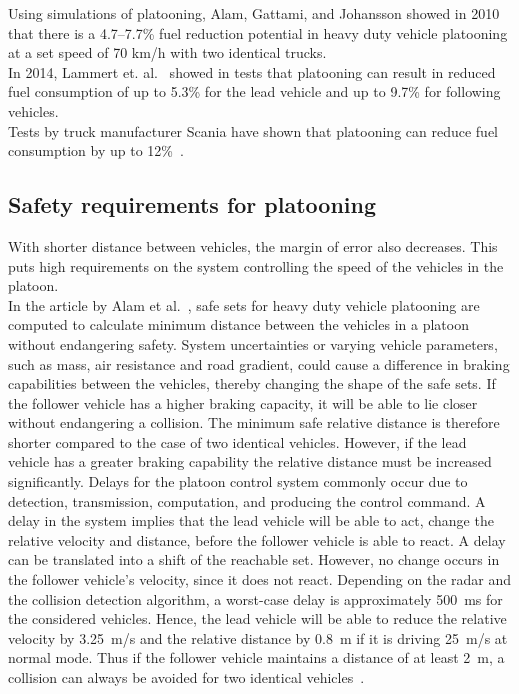 Using simulations of platooning, Alam, Gattami, and Johansson \cite{johansson2010} showed in 2010 that there is a \mbox{4.7--7.7\%} fuel reduction potential in heavy duty vehicle platooning at a set speed of 70 km/h with two identical trucks.\\

In 2014, Lammert et. al.~\cite{lammert2014} showed in tests that platooning can result in reduced fuel consumption of up to 5.3\% for the lead vehicle and up to 9.7\% for following vehicles.\\

Tests by truck manufacturer Scania have shown that platooning can reduce fuel consumption by up to 12\%~\cite{scania2015}.

\subsection{Safety requirements for platooning}
With shorter distance between vehicles, the margin of error also decreases. This puts high requirements on the system controlling the speed of the vehicles in the platoon.\\

In the article by Alam et al.~\cite{johansson2013}, safe sets for heavy duty vehicle platooning are computed to calculate minimum distance between the  vehicles in a platoon without endangering safety. System uncertainties or varying vehicle parameters, such as mass, air resistance and road gradient, could cause a difference in braking capabilities between the vehicles, thereby changing the shape of the safe sets. If the follower vehicle has a higher braking capacity, it will be able to lie closer without endangering a collision. The minimum safe relative distance is therefore shorter compared to the case of two identical vehicles. However, if the lead vehicle has a greater braking capability the relative distance must be increased significantly. Delays for the platoon control system commonly occur due to detection, transmission, computation, and producing the control command. A delay in the system implies that the lead vehicle will be able to act, change the relative velocity and distance, before the follower vehicle is able to react. A delay can be translated into a shift of the reachable set. However, no change occurs in the follower vehicle's velocity, since it does not react. Depending on the radar and the collision detection algorithm, a worst-case delay is approximately 500~ms for the considered vehicles. Hence, the lead vehicle will be able to reduce the relative velocity by 3.25~m/s and the relative distance by 0.8~m if it is driving 25~m/s at normal mode. Thus if the follower vehicle maintains a distance of at least 2~m, a collision can always be avoided for two identical vehicles~\cite{johansson2013}.

